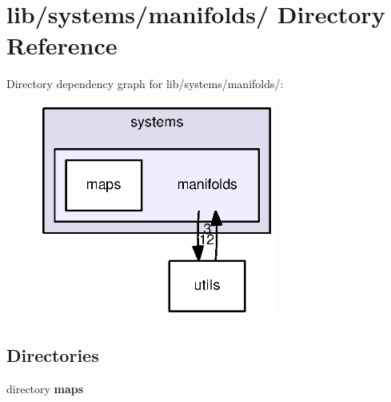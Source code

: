 \section{lib/systems/manifolds/ \-Directory \-Reference}
\label{dir_e0b4743ced4f18fd8aa0b7854862c8ed}
\-Directory dependency graph for lib/systems/manifolds/\-:
\nopagebreak
\begin{figure}[H]
\begin{center}
\leavevmode
\includegraphics[width=222pt]{dir_e0b4743ced4f18fd8aa0b7854862c8ed_dep}
\end{center}
\end{figure}
\subsection*{\-Directories}
\begin{DoxyCompactItemize}
\item 
directory {\bf maps}
\end{DoxyCompactItemize}

